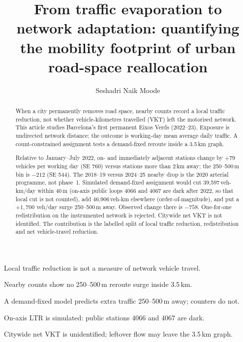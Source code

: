 \documentclass[a4paper,fleqn]{cas-dc}
\begin{document}
\let\WriteBookmarks\relax
\def\floatpagepagefraction{1}
\def\textpagefraction{.98}


\title[mode=title]{From traffic evaporation to network adaptation:
quantifying the mobility footprint of urban road-space reallocation}

\author[1]{Seshadri Naik Moode}
\cormark[1]

\begin{abstract}
When a city permanently removes road space, nearby counts record a local
traffic reduction, not whether vehicle-kilometres travelled (VKT) left the
motorised network. This article studies Barcelona's first permanent Eixos
Verds (2022--23). Exposure is undirected network distance; the outcome is
working-day mean average daily traffic. A count-constrained assignment tests
a demand-fixed reroute inside a 3.5\,km graph.

Relative to January--July 2022, on- and immediately adjacent stations change
by $+79$ vehicles per working day (SE 760) versus stations more than 2\,km
away; the 250--500\,m bin is $-212$ (SE 544). The 2018--19 versus 2024--25
nearby drop is the 2020 arterial programme, not phase~1. Simulated
demand-fixed assignment would cut 39{,}597\,veh-km/day within 40\,m (on-axis
public loops 4066 and 4067 are dark after 2022, so that local cut is not
counted), add 46{,}906\,veh-km elsewhere (order-of-magnitude), and put a
$+1{,}700$ veh/day surge 250--500\,m away. Observed change there is $-758$.
One-for-one redistribution on the instrumented network is rejected. Citywide
net VKT is not identified. The contribution is the labelled split of local
traffic reduction, redistribution and net vehicle-travel reduction.
\end{abstract}

\begin{highlights}
\item Local traffic reduction is not a measure of network vehicle travel.
\item Nearby counts show no 250--500\,m reroute surge inside 3.5\,km.
\item A demand-fixed model predicts extra traffic 250--500\,m away; counters do not.
\item On-axis LTR is simulated: public stations 4066 and 4067 are dark.
\item Citywide net VKT is unidentified; leftover flow may leave the 3.5\,km graph.
\end{highlights}
\end{document}
